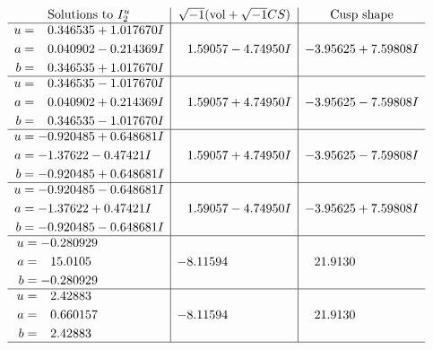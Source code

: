 \documentclass[1p]{elsarticle_modified}
\theoremstyle{definition}
\newcommand{\I}{\sqrt{-1}}
\begin{document}
$$\begin{array}{c|c|c}  
\text{Solutions to }I^u_{2}& \I (\text{vol} + \sqrt{-1}CS) & \text{Cusp shape}\\
 \hline 
\begin{aligned}
u &= \phantom{-}0.346535 + 1.017670 I \\
a &= \phantom{-}0.040902 - 0.214369 I \\
b &= \phantom{-}0.346535 + 1.017670 I\end{aligned}
 & \phantom{-}1.59057 - 4.74950 I & -3.95625 + 7.59808 I \\ \hline\begin{aligned}
u &= \phantom{-}0.346535 - 1.017670 I \\
a &= \phantom{-}0.040902 + 0.214369 I \\
b &= \phantom{-}0.346535 - 1.017670 I\end{aligned}
 & \phantom{-}1.59057 + 4.74950 I & -3.95625 - 7.59808 I \\ \hline\begin{aligned}
u &= -0.920485 + 0.648681 I \\
a &= -1.37622 - 0.47421 I \\
b &= -0.920485 + 0.648681 I\end{aligned}
 & \phantom{-}1.59057 + 4.74950 I & -3.95625 - 7.59808 I \\ \hline\begin{aligned}
u &= -0.920485 - 0.648681 I \\
a &= -1.37622 + 0.47421 I \\
b &= -0.920485 - 0.648681 I\end{aligned}
 & \phantom{-}1.59057 - 4.74950 I & -3.95625 + 7.59808 I \\ \hline\begin{aligned}
u &= -0.280929\phantom{ +0.000000I} \\
a &= \phantom{-}15.0105\phantom{ +0.000000I} \\
b &= -0.280929\phantom{ +0.000000I}\end{aligned}
 & -8.11594\phantom{ +0.000000I} & \phantom{-}21.9130\phantom{ +0.000000I} \\ \hline\begin{aligned}
u &= \phantom{-}2.42883\phantom{ +0.000000I} \\
a &= \phantom{-}0.660157\phantom{ +0.000000I} \\
b &= \phantom{-}2.42883\phantom{ +0.000000I}\end{aligned}
 & -8.11594\phantom{ +0.000000I} & \phantom{-}21.9130\phantom{ +0.000000I}\\
 \hline 
 \end{array}$$\newpage\newpage\renewcommand{\arraystretch}{1}
\end{document}
